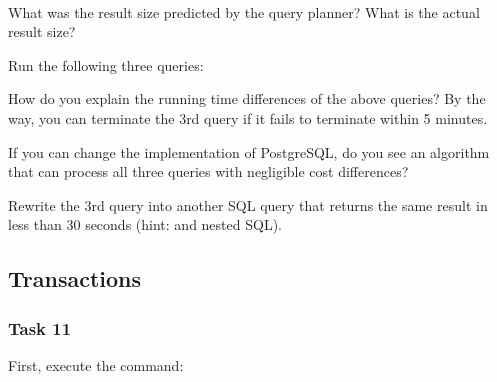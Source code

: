 \vgap

\noindent {} \\

\vgap

\noindent What was the result size predicted by the query planner? What is the actual result size?

\vgap

\noindent Run the following three queries:


\noindent How do you explain the running time differences of the above queries? By the way, you can terminate the 3rd query if it fails to terminate within 5 minutes.

\vgap

\noindent If you can change the implementation of PostgreSQL, do you see an algorithm that can process all three queries with negligible cost differences?

\vgap

Rewrite the 3rd query into another SQL query that returns the same result in less than 30 seconds (hint:  and nested SQL).


\subsection{Transactions}

\subsubsection{Task 11}

First, execute the command:

\vgap

\noindent
{}

\vgap

